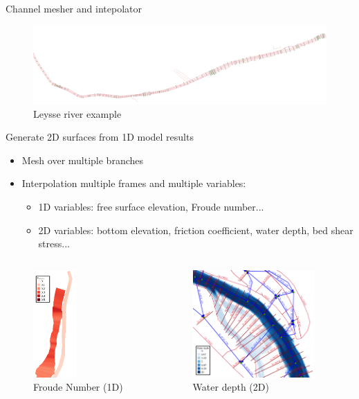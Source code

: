 \documentclass[10pt]{beamer}
\begin{document}
\begin{frame}{Channel mesher and intepolator}

\begin{figure}[H]
    \centering
    \includegraphics[width=\textwidth]{figures/leysse.png}
    \caption{Leysse river example}
\end{figure}

\end{frame}


\begin{frame}{Generate 2D surfaces from 1D model results}

\begin{itemize}
    \item Mesh over multiple branches
    \item Interpolation multiple frames and multiple variables:
        \begin{itemize}
            \item 1D variables: free surface elevation, Froude number...
            \item 2D variables: bottom elevation, friction coefficient, water depth, bed shear stress...
        \end{itemize}
\end{itemize}

  \begin{columns}[T,onlytextwidth]
    \begin{figure}[H]
            \centering
            \includegraphics[height=4.1cm]{figures/mesh_crue10_run_froude.png}
        \caption{Froude Number (1D)}
    \end{figure}

    \begin{figure}[H]
            \centering
            \includegraphics[height=4.1cm]{figures/mesh_crue10_run_hauteur_eau.png}
        \caption{Water depth (2D)}
    \end{figure}
  \end{columns}


\end{frame}
\end{document}
